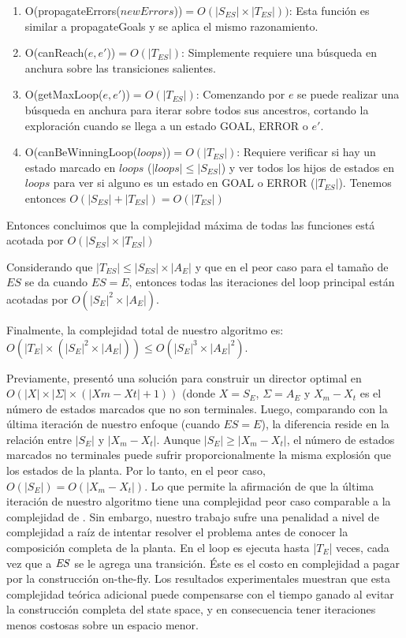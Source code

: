 \begin{enumerate}
	\item O(propagateErrors($newErrors$))$ = O(|S_{ES}| \times |T_{ES}|))$: Esta función es similar a propagateGoals y se aplica el mismo razonamiento.	
	
	\item O(canReach($e, e'$))$ = O(|T_{ES}|)$: Simplemente requiere una búsqueda en anchura sobre las transiciones salientes.
	
	\item O(getMaxLoop($e, e'$))$ = O(|T_{ES}|)$: 
	Comenzando por $e$ se puede realizar una búsqueda en anchura para iterar sobre todos sus ancestros, cortando la exploración cuando se llega a un estado GOAL, ERROR o $e'$. 
	
	
	\item O(canBeWinningLoop($loops$))$ = O(|T_{ES}|)$: Requiere verificar si hay un estado marcado en $loops$ ($|loops| \leq |S_{ES}|$) y ver todos los hijos de estados en $loops$ para ver si alguno es un estado en GOAL o ERROR ($|T_{ES}|$).  
	Tenemos entonces $O(|S_{ES}| + |T_{ES}|) = O(|T_{ES}|)$
	
\end{enumerate}

Entonces concluimos que la complejidad máxima de todas las funciones está acotada por $O(|S_{ES}| \times |T_{ES}|)$  

Considerando que $|T_{ES}| \leq|S_{ES}|\times|A_E|$ y que en el peor caso para el tamaño de $ES$ se da cuando $ES=E$, entonces todas las iteraciones del loop principal están acotadas por $O(|S_E|^2\times|A_E|)$.

Finalmente, la complejidad total de nuestro algoritmo es: $O(|T_E| \times (|S_E|^2 \times |A_E|)) \leq O(|S_E|^3 \times |A_E|^2)$.

Previamente, \cite{Huang:2007:Optimal}
presentó una solución para construir un director optimal en $O(|X| \times |\Sigma| × (|X m − X t | + 1))$ (donde $X=S_E$, $\Sigma = A_E$ y $X_m - X_t$ es el número de 
estados marcados que no son terminales. 
Luego, comparando \cite{Huang:2007:Optimal} 
con la última iteración de nuestro enfoque (cuando $ES=E$), la diferencia reside en la relación entre
$|S_E|$ y $|X_m - X_t|$. 
Aunque $|S_E| \geq |X_m - X_t|$, el número de estados marcados no terminales puede sufrir proporcionalmente la misma explosión que los estados de la planta.
Por lo tanto, en el peor caso, $O(|S_E|) = O(|X_m - X_t|)$. Lo que permite la afirmación de que la última iteración de nuestro algoritmo tiene una complejidad peor caso comparable a la complejidad de 
\cite{Huang:2007:Optimal}.
Sin embargo, nuestro trabajo sufre una penalidad a nivel de complejidad a raíz de intentar resolver el problema antes de conocer la composición completa de la planta. En \DCS el loop es ejecuta hasta
|$T_E$| veces, cada vez que a $\mathit{ES}$ se le agrega una transición. Éste es el costo en complejidad a pagar por la construcción on-the-fly. 
Los resultados experimentales muestran que esta complejidad teórica adicional puede compensarse con el tiempo ganado al evitar la construcción completa del state space, y en consecuencia tener iteraciones menos costosas sobre un espacio menor. 







